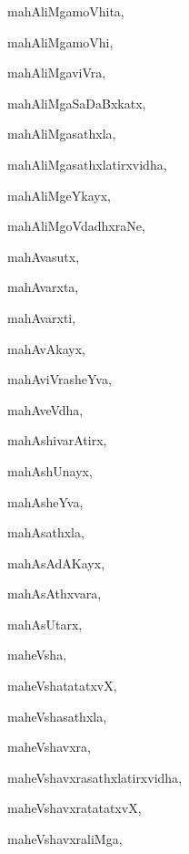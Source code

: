 \begin{multicols}{3}
{\noindent
{mahAliMgamoVhita}, \pageref{mahAliMgamoVhita}

\noindent
{mahAliMgamoVhi}, \pageref{mahAliMgamoVhi}

\noindent
{mahAliMgaviVra}, \pageref{mahAliMgaviVra}

\noindent
{mahAliMgaSaDaBxkatx}, \pageref{mahAliMgaSaDaBxkatx}

\noindent
{mahAliMgasathxla}, \pageref{mahAliMgasathxla}

\noindent
{mahAliMgasathxlatirxvidha}, \pageref{mahAliMgasathxlatirxvidha}

\noindent
{mahAliMgeYkayx}, \pageref{mahAliMgeYkayx}

\noindent
{mahAliMgoVdadhxraNe}, \pageref{mahAliMgoVdadhxraNe}

\noindent
{mahAvasutx}, \pageref{mahAvasutx}

\noindent
{mahAvarxta}, \pageref{mahAvarxta}

\noindent
{mahAvarxti}, \pageref{mahAvarxti}

\noindent
{mahAvAkayx}, \pageref{mahAvAkayx}

\noindent
{mahAviVrasheYva}, \pageref{mahAviVrasheYva}

\noindent
{mahAveVdha}, \pageref{mahAveVdha}

\noindent
{mahAshivarAtirx}, \pageref{mahAshivarAtirx}

\noindent
{mahAshUnayx}, \pageref{mahAshUnayx}

\noindent
{mahAsheYva}, \pageref{mahAsheYva}

\noindent
{mahAsathxla}, \pageref{mahAsathxla}

\noindent
{mahAsAdAKayx}, \pageref{mahAsAdAKayx}

\noindent
{mahAsAthxvara}, \pageref{mahAsAthxvara}

\noindent
{mahAsUtarx}, \pageref{mahAsUtarx}

\noindent
{maheVsha}, \pageref{maheVsha}

\noindent
{maheVshatatatxvX}, \pageref{maheVshatatatxvX}

\noindent
{maheVshasathxla}, \pageref{maheVshasathxla}

\noindent
{maheVshavxra}, \pageref{maheVshavxra}

\noindent
{maheVshavxrasathxlatirxvidha}, \pageref{maheVshavxrasathxlatirxvidha}

\noindent
{maheVshavxratatatxvX}, \pageref{maheVshavxratatatxvX}

\noindent
{maheVshavxraliMga}, \pageref{maheVshavxraliMga}

}
\end{multicols}
